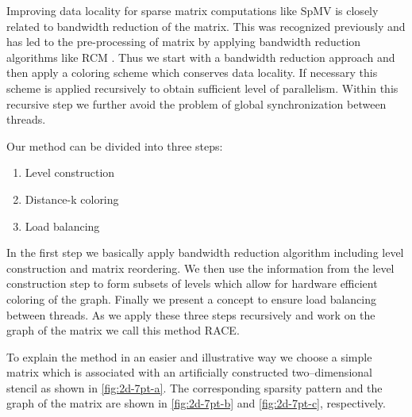Improving data locality for sparse matrix computations like \acrshort{SpMV}  is closely related to bandwidth reduction of the matrix. This was recognized previously and has led to the pre-processing of matrix by applying bandwidth reduction algorithms like \acrfull{RCM} \cite{RCM,RCM_Sparse_computation}. Thus we start  with a bandwidth reduction approach and then apply a coloring scheme which conserves data locality. If necessary this scheme is applied recursively to obtain sufficient level of parallelism. Within this recursive step we further avoid the problem of global synchronization between threads.

 
Our method can be divided into three steps:
\begin{enumerate}
	\item Level construction
	\item Distance-k coloring
	\item Load balancing
\end{enumerate}

In the first step we basically apply bandwidth reduction algorithm including level construction and matrix reordering. We then use the information from the level construction step to form subsets of levels which allow for hardware efficient \DK coloring of the graph. Finally we present a concept to ensure load balancing between threads. As we apply these three steps recursively and work on the graph of the matrix we call this method \acrfull{RACE}.



To explain the method in an easier and illustrative way we choose a simple matrix which is associated with an artificially constructed two--dimensional stencil as shown in \cref{fig:2d-7pt-a}. The corresponding sparsity pattern and the graph of the matrix are shown in \cref{fig:2d-7pt-b} and \cref{fig:2d-7pt-c}, respectively.

